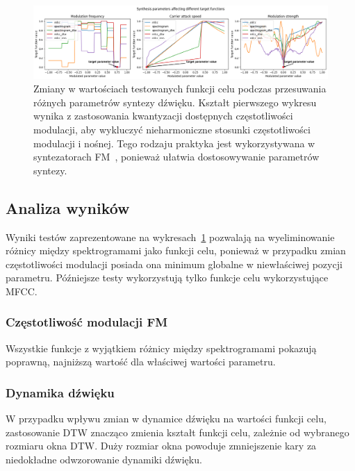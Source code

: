 \begin{figure}[H]\label{fig:target_function_testing}
    \centering
    \includegraphics[width=1.0\linewidth]{rys03/target_function_testing.png}
    \caption{
      Zmiany w wartościach testowanych funkcji celu podczas przesuwania różnych parametrów syntezy dźwięku. 
      Kształt pierwszego wykresu wynika z zastosowania kwantyzacji dostępnych częstotliwości modulacji,
      aby wykluczyć nieharmoniczne stosunki częstotliwości modulacji i nośnej. Tego rodzaju praktyka
      jest wykorzystywana w syntezatorach FM~\cite{digitone_manual}, ponieważ ułatwia dostosowywanie parametrów syntezy.
    }
\end{figure}

\subsection{Analiza wyników}

Wyniki testów zaprezentowane na wykresach~\ref{fig:target_function_testing} pozwalają na
wyeliminowanie różnicy między spektrogramami jako funkcji celu,
ponieważ w przypadku zmian częstotliwości modulacji posiada ona minimum globalne w 
niewłaściwej pozycji parametru. Późniejsze testy wykorzystują tylko funkcje celu
wykorzystujące MFCC\@.

\subsubsection{Częstotliwość modulacji FM}

Wszystkie funkcje z wyjątkiem różnicy między spektrogramami pokazują poprawną, 
najniższą wartość dla właściwej wartości parametru.

\subsubsection{Dynamika dźwięku}

W przypadku wpływu zmian w dynamice dźwięku na wartości funkcji celu,
zastosowanie DTW znacząco zmienia kształt funkcji celu, zależnie od wybranego rozmiaru
okna DTW\@. Duży rozmiar okna powoduje zmniejszenie kary za niedokładne odwzorowanie
dynamiki dźwięku. 

